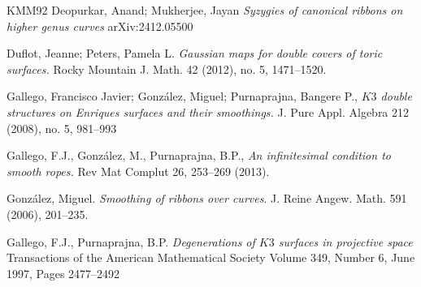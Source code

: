 \documentclass[11pt,twoside]{amsart}
\theoremstyle{plain}
\numberwithin{equation}{section}
\theoremstyle{definition}
\begin{document}
\begin{thebibliography}{KMM92}
Deopurkar, Anand; Mukherjee, Jayan
\emph{Syzygies of canonical ribbons on higher genus curves}
arXiv:2412.05500


Duflot, Jeanne; Peters, Pamela L.
\emph{Gaussian maps for double covers of toric surfaces.}
Rocky Mountain J. Math. 42 (2012), no. 5, 1471–1520.













 

\color{black}




Gallego, Francisco Javier; González, Miguel; Purnaprajna, Bangere P., 
\emph{$K3$ double structures on Enriques surfaces and their smoothings.}
J. Pure Appl. Algebra 212 (2008), no. 5, 981--993

Gallego, F.J., González, M., Purnaprajna, B.P., 
\emph{An infinitesimal condition to smooth ropes.}
Rev Mat Complut 26, 253–269 (2013).

  Gonz\'alez, Miguel.
  \emph{Smoothing of ribbons over curves}.
  J. Reine Angew. Math. 591 (2006), 201--235.

Gallego, F.J., Purnaprajna, B.P.
\emph{Degenerations of $K3$ surfaces in projective space}
Transactions of the American Mathematical Society
Volume 349, Number 6, June 1997, Pages 2477–2492



  \color{black}



\end{thebibliography}
\end{document}
